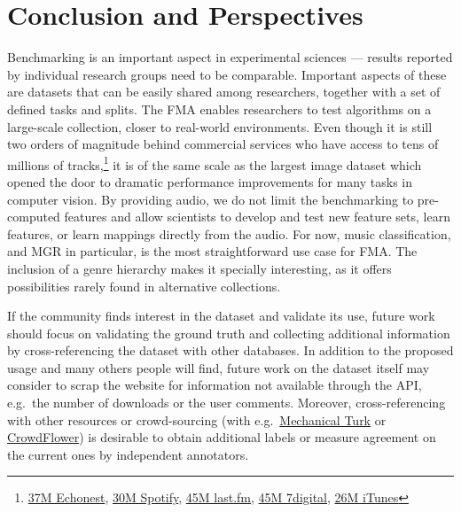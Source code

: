 \documentclass{article}
\newcommand{\todo}[1]{{\color{red} #1}}
\begin{document}
\section{Conclusion and Perspectives}


Benchmarking is an important aspect in experimental sciences --- results reported by individual research groups need to be comparable. Important aspects of these are datasets that can be easily shared among researchers, together with a set of defined tasks and splits. The FMA enables researchers to test algorithms on a large-scale collection, closer to real-world environments. Even though it is still two orders of magnitude behind commercial services who have access to tens of millions of tracks,\footnote{\href{http://the.echonest.com}{37M Echonest}, \href{https://en.wikipedia.org/wiki/Spotify}{30M Spotify}, \href{http://www.skilledtests.com/wiki/Last.fm_statistics}{45M last.fm}, \href{http://bupz.com/best-websites-to-buy-musics}{45M 7digital}, \href{https://www.apple.com/pr/library/2013/02/06iTunes-Store-Sets-New-Record-with-25-Billion-Songs-Sold.html}{26M iTunes}} it is of the same scale as the largest image dataset which opened the door to dramatic performance improvements for many tasks in computer vision.
By providing audio, we do not limit the benchmarking to pre-computed features and allow scientists to develop and test new feature sets, learn features, or learn mappings directly from the audio.
For now, music classification, and MGR in particular, is the most straightforward use case for FMA. The inclusion of a genre hierarchy makes it specially interesting, as it offers possibilities rarely found in alternative collections.


\todo{If the community finds interest in the dataset and validate its use, future work should focus on validating the ground truth and collecting additional information by cross-referencing the dataset with other databases.}
In addition to the proposed usage and many others people will find, future work on the dataset itself may consider to scrap the website for information not available through the API, e.g.\ the number of downloads or the user comments. Moreover, cross-referencing with other resources or crowd-sourcing (with e.g.\ \href{https://www.mturk.com}{Mechanical Turk} or \href{https://www.crowdflower.com/}{CrowdFlower}) is desirable to obtain additional labels or measure agreement on the current ones by independent annotators.
\end{document}
